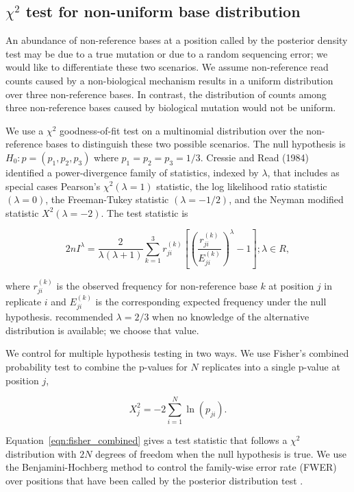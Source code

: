 \documentclass{bioinfo}
\begin{document}
\subsection{$\chi^2$ test for non-uniform base distribution}

An abundance of non-reference bases at a position called by the posterior density test may be due to a true mutation or due to a random sequencing error; we would like to differentiate these two scenarios. We assume non-reference read counts caused by a non-biological mechanism results in a uniform distribution over three non-reference bases. In contrast, the distribution of counts among three non-reference bases caused by biological mutation would not be uniform.

We use a $\chi^2$ goodness-of-fit test on a multinomial distribution over the non-reference bases to distinguish these two possible scenarios. The null hypothesis is $H_0: p = (p_1, p_2, p_3)$ where $p_1=p_2=p_3=1/3$. Cressie and Read (1984) identified a power-divergence family of statistics, indexed by $\lambda$, that includes as special cases Pearson's $\chi^2 (\lambda = 1)$ statistic, the log likelihood ratio statistic $(\lambda = 0)$, the Freeman-Tukey statistic $(\lambda = -1/2)$, and the Neyman modified statistic $X^2 (\lambda = -2)$. The test statistic is

\begin{equation}
 2nI^\lambda = \frac{2}{\lambda(\lambda+1)}\sum_{k=1}^3 r_{ji}^{(k)} \left[\left(\frac{r_{ji}^{(k)}}{E_{ji}^{(k)}}\right)^\lambda-1\right];\lambda \in R,
\end{equation}

where $r_{ji}^{(k)}$ is the observed frequency for non-reference base $k$ at position $j$ in replicate $i$ and $E_{ji}^{(k)}$ is the corresponding expected frequency under the null hypothesis. \citet{cressie1984multinomial} recommended $\lambda = 2/3$ when no knowledge of the alternative distribution is available; we choose that value.

We control for multiple hypothesis testing in two ways. We use Fisher's combined probability test \citep{fisher1970statistical} to combine the p-values for $N$ replicates into a single p-value at position $j$,

\begin{equation}\label{eqn:fisher_combined}
	X_j^2 = -2 \sum_{i=1}^N \ln(p_{ji}).
\end{equation}

Equation~\eqref{eqn:fisher_combined} gives a test statistic that follows a $\chi^2$ distribution with $2N$ degrees of freedom when the null hypothesis is true. We use the Benjamini-Hochberg method to control the family-wise error rate (FWER) over positions that have been called by the posterior distribution test \citep{benjamini1995controlling, efron2010large}.
\end{document}
